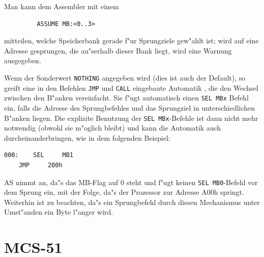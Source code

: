 \documentclass[12pt,a4paper,twoside]{report}
\newcommand{\tty}[1]{{\tt #1}}
\newcommand{\asname}{AS}
\begin{document}
Man kann dem Assembler mit einem
\begin{verbatim}
         ASSUME MB:<0..3>
\end{verbatim}
mitteilen, welche Speicherbank gerade f"ur Sprungziele gew"ahlt ist; wird auf
eine Adresse gesprungen, die au"serhalb dieser Bank liegt, wird eine Warnung
ausgegeben.

Wenn der Sonderwert {\tt NOTHING} angegeben wird (dies ist auch der Default), 
so greift eine in den Befehlen \tty{JMP} und \tty{CALL} eingebaute Automatik ,
die den Wechsel zwischen den B"anken vereinfacht.  Sie f"ugt automatisch einen
{\tt SEL MBx} Befehl ein, falls die Adresse des Sprungbefehles und das
Sprungziel in unterschiedlichen B"anken liegen.  Die explizite Benutzung der
\tty{SEL MBx}-Befehle ist dann nicht mehr notwendig (obwohl sie m"oglich
bleibt) und kann die Automatik auch durcheinanderbringen, wie in dem folgenden
Beispiel:
\begin{verbatim}
000:    SEL     MB1
	JMP     200h
\end{verbatim}
\asname{} nimmt an, da"s das MB-Flag auf 0 steht und f"ugt keinen
\tty{SEL MB0}-Befehl vor dem Sprung ein, mit der Folge, da"s der
Prozessor zur Adresse A00h springt.
Weiterhin ist zu beachten, da"s ein Sprungbefehl durch diesen Mechanismus
unter Umst"anden ein Byte l"anger wird.


\section{MCS-51}
\end{document}
